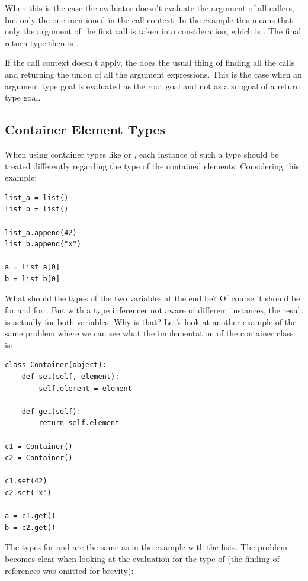 \documentclass[12pt,halfparskip,DIV11,BCOR10mm]{scrreprt}
\begin{document}
When this is the case the evaluator doesn't evaluate the argument of all callers, but only the one mentioned in the call context. In the example this means that only the argument of the first call is taken into consideration, which is . The final return type then is .

If the call context doesn't apply, the  does the usual thing of finding all the calls and returning the union of all the argument expressions. This is the case when an argument type goal is evaluated as the root goal and not as a subgoal of a return type goal.


\subsection{Container Element Types}

When using container types like  or , each instance of such a type should be treated differently regarding the type of the contained elements. Considering this example:

\begin{lstlisting}
list_a = list()
list_b = list()

list_a.append(42)
list_b.append("x")

a = list_a[0]
b = list_b[0]
\end{lstlisting}

What should the types of the two variables at the end be? Of course it should be  for  and  for . But with a type inferencer not aware of different instances, the result is actually  for both variables. Why is that? Let's look at another example of the same problem where we can see what the implementation of the container class is:

\begin{lstlisting}
class Container(object):
    def set(self, element):
        self.element = element

    def get(self):
        return self.element

c1 = Container()
c2 = Container()

c1.set(42)
c2.set("x")

a = c1.get()
b = c2.get()
\end{lstlisting}

The types for  and  are the same as in the example with the lists. The problem becomes clear when looking at the evaluation for the type of  (the finding of references was omitted for brevity):
\end{document}
